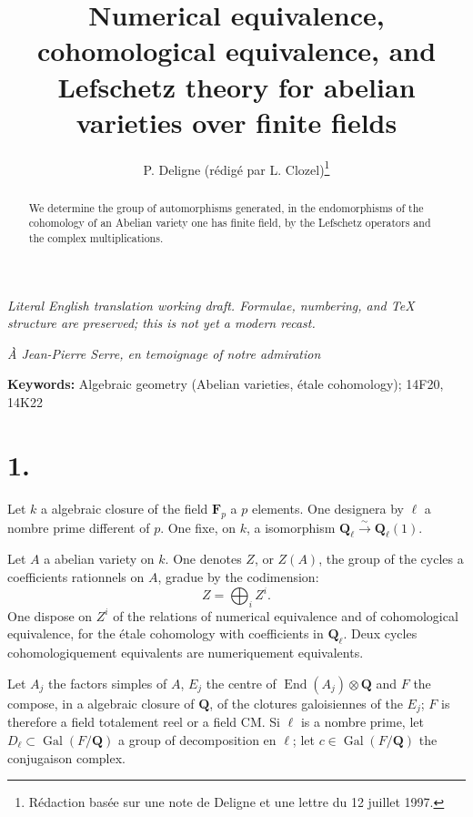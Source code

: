 \documentclass[11pt,a4paper]{article}
\title{Numerical equivalence, cohomological equivalence, and Lefschetz theory for abelian varieties over finite fields}
\author{P. Deligne (r\'edig\'e par L. Clozel)\thanks{R\'edaction bas\'ee sur une note de Deligne et une lettre du 12 juillet 1997.}}
\date{}
\theoremstyle{plain}
\theoremstyle{definition}
\DeclareMathOperator{\Gal}{Gal}
\DeclareMathOperator{\End}{End}
\begin{document}
\begin{center}\small\emph{Literal English translation working draft. Formulae, numbering, and TeX structure are preserved; this is not yet a modern recast.}\end{center}
\vspace{0.5em}


\maketitle

\begin{center}
\textit{\`A Jean-Pierre Serre, en temoignage of notre admiration}
\end{center}

\begin{abstract}\noindent
We determine the group of automorphisms generated, in the endomorphisms of the cohomology of an Abelian variety one has finite field, by the Lefschetz operators and the complex multiplications.
\end{abstract}

\noindent\textbf{Keywords:} Algebraic geometry (Abelian varieties, étale cohomology); 14F20, 14K22

\section*{1.}

Let $k$ a algebraic closure of the field $\mathbf{F}_p$ a $p$ elements. One designera by $\ell$ a nombre prime different of $p$. One fixe, on $k$, a isomorphism $\mathbf{Q}_\ell \xrightarrow{\sim} \mathbf{Q}_\ell(1)$.

Let $A$ a abelian variety on $k$. One denotes $Z$, or $Z(A)$, the group of the cycles a coefficients rationnels on $A$, gradue by the codimension:
\[
Z = \bigoplus_i Z^i .
\]
One dispose on $Z^i$ of the relations of numerical equivalence and of cohomological equivalence, for the étale cohomology with coefficients in $\mathbf{Q}_\ell$. Deux cycles cohomologiquement equivalents are numeriquement equivalents.

Let $A_j$ the factors simples of $A$, $E_j$ the centre of $\End(A_j) \otimes \mathbf{Q}$ and $F$ the compose, in a algebraic closure of $\mathbf{Q}$, of the clotures galoisiennes of the $E_j$; $F$ is therefore a field totalement reel or a field CM. Si $\ell$ is a nombre prime, let $D_\ell \subset \Gal(F/\mathbf{Q})$ a group of decomposition en $\ell$; let $c \in \Gal(F/\mathbf{Q})$ the conjugaison complex.
\end{document}
